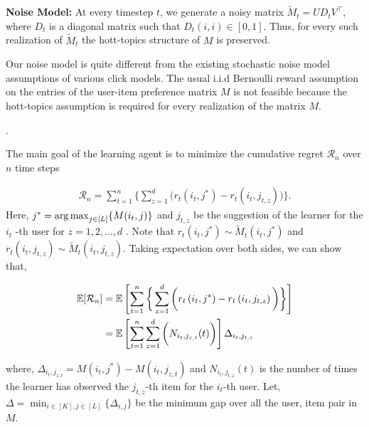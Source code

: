 \textbf{Noise Model:}  At every timestep $t$, we generate a noisy matrix $\tilde{M}_t = UD_t V^{\intercal}$, where $D_t$ is a diagonal matrix such that $D_t(i,i)\in[0,1]$. Thus, for every such realization of $\tilde{M}_t$  the hott-topics structure of $M$ is preserved. 

\begin{discussion}
Our noise model is quite different from the existing stochastic noise model assumptions of various click models. The usual i.i.d Bernoulli reward assumption on the entries of the user-item preference matrix $M$ is not feasible because the hott-topics assumption is required for every realization of the matrix $M$. 
\end{discussion}

.



The main goal of the learning agent is to minimize the cumulative regret $\mathcal{R}_n$  over $n$ time steps

\begin{align*}
\mathcal{R}_n = \sum_{t=1}^{n}\bigg\lbrace \sum_{z=1}^{d} \bigg( r_{t}\left(i_{t}, j^* \right) - r_{t}\left( i_{t}, j_{t,z}\right)\bigg)\bigg\rbrace.
\end{align*}
Here, $j^* = \mathop{\rm arg\,max}_{j\in [L]}\lbrace M(i_t,j)\rbrace$  and $j_{t,z}$ be the suggestion of the learner for the $i_t$ -th user for  $z=1,2,\ldots, d$ . Note that $r_{t}\left(i_t, j^* \right)\sim \tilde{M}_t\left(i_t, j^*\right)$ and $r_{t}\left(i_t, j_{t,z} \right)\sim \tilde{M}_t\left(i_t, j_{t,z} \right)$. Taking expectation over both sides, we can show that,

\begin{align*}
\mathbb{E}[\mathcal{R}_n] & = \mathbb{E}\left [ \sum_{t=1}^{n}\bigg\lbrace\sum_{z=1}^{d} \bigg( r_{t}\left(i_t, j^* \right) - r_{t}\left( i_t, j_{t,z}\right)\bigg)\bigg\rbrace\right] \\
&= \mathbb{E}\left [ \sum_{t=1}^{n} \sum_{z=1}^{d} \bigg( N_{i_t,j_{z,t}}(t)\bigg) \right ]\Delta_{i_t,j_{t,z}}
\end{align*}

where, $\Delta_{i_t,j_{z,t}} = M(i_t,j^*) - M(i_t,j_{z,t})$ and $N_{i_t,j_{t,z}}(t)$ is the number of times the learner has observed the $j_{t,z}$-th item for the $i_t$-th user. Let, $\Delta = \min_{i\in[K],j\in[L]}\lbrace \Delta_{i,j}\rbrace$ be the minimum gap over all the user, item pair in $M$.
